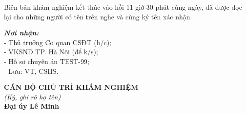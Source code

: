 \documentclass[12pt,a4paper]{article}
\begin{document}
\noindent Biên bản khám nghiệm kết thúc vào hồi 11 giờ 30 phút cùng ngày, đã được đọc lại cho những người có tên trên nghe và cùng ký tên xác nhận.

\vspace{0.8cm}

\noindent
\begin{minipage}[t]{0.45\textwidth}
    \small
    \textbf{\textit{Nơi nhận:}}\\
    - Thủ trưởng Cơ quan CSĐT (b/c);\\
    - VKSND TP. Hà Nội (để k/s);\\
    - Hồ sơ chuyên án TEST-99;\\
    - Lưu: VT, CSHS.
\end{minipage}
\hfill
\begin{minipage}[t]{0.5\textwidth}
    \begin{center}
        \small
        \textbf{CÁN BỘ CHỦ TRÌ KHÁM NGHIỆM}\\
        \textit{(Ký, ghi rõ họ tên)}\\[1.5cm]
        \textbf{Đại úy Lê Minh}
    \end{center}
\end{minipage}
\end{document}
